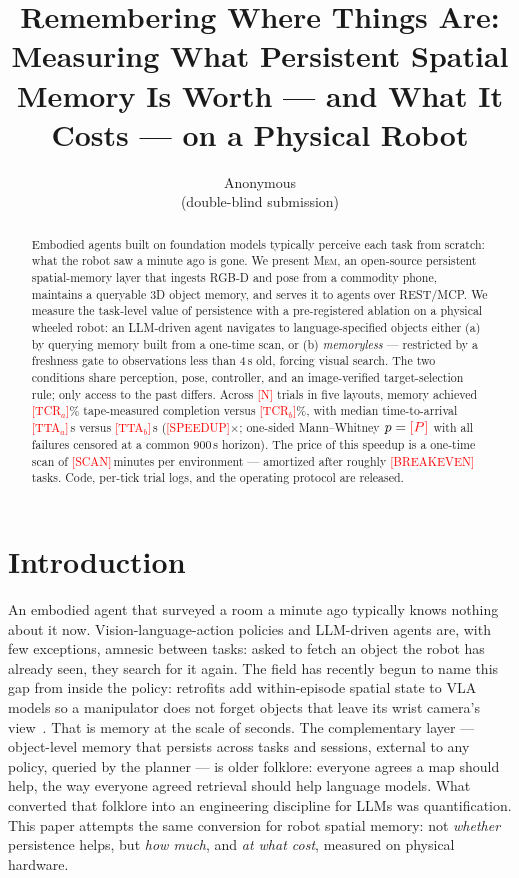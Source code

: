 \documentclass{article}
\title{Remembering Where Things Are: Measuring What Persistent Spatial
Memory Is Worth --- and What It Costs --- on a Physical Robot}
\author{Anonymous\\ (double-blind submission)}
\newcommand{\todo}[1]{\textcolor{red}{[#1]}}
\newcommand{\rtsm}{\textsc{Mem}} %
\begin{document}
\maketitle

\begin{abstract}
Embodied agents built on foundation models typically perceive each task
from scratch: what the robot saw a minute ago is gone. We present
\rtsm{}, an open-source persistent spatial-memory layer that ingests
RGB-D and pose from a commodity phone, maintains a queryable 3D object
memory, and serves it to agents over REST/MCP\@. We measure the
task-level value of persistence with a pre-registered ablation on a
physical wheeled robot: an LLM-driven agent navigates to
language-specified objects either (a) by querying memory built from a
one-time scan, or (b) \emph{memoryless} --- restricted by a freshness
gate to observations less than 4\,s old, forcing visual search. The two
conditions share perception, pose, controller, and an image-verified
target-selection rule; only access to the past differs. Across
\todo{N} trials in five layouts, memory achieved \todo{TCR$_a$}\%
tape-measured completion versus \todo{TCR$_b$}\%, with median
time-to-arrival \todo{TTA$_a$}\,s versus \todo{TTA$_b$}\,s
(\todo{SPEEDUP}$\times$; one-sided Mann--Whitney $p=\todo{P}$ with all
failures censored at a common 900\,s horizon). The price of this
speedup is a one-time scan of \todo{SCAN}\,minutes per environment ---
amortized after roughly \todo{BREAKEVEN} tasks. Code, per-tick trial
logs, and the operating protocol are released.
\end{abstract}

\section{Introduction}

An embodied agent that surveyed a room a minute ago typically knows
nothing about it now. Vision-language-action policies and LLM-driven
agents are, with few exceptions, amnesic between tasks: asked to fetch
an object the robot has already seen, they search for it again. The
field has recently begun to name this gap from inside the policy:
retrofits add within-episode spatial state to VLA models so a
manipulator does not forget objects that leave its wrist camera's
view~\cite{AtlasVLA2026}. That is memory at the scale of seconds. The
complementary layer --- object-level memory that persists across tasks
and sessions, external to any policy, queried by the planner --- is
older folklore: everyone agrees a map should help, the way everyone
agreed retrieval should help language models. What converted that
folklore into an engineering discipline for LLMs was quantification.
This paper attempts the same conversion for robot spatial memory: not
\emph{whether} persistence helps, but \emph{how much}, and \emph{at
what cost}, measured on physical hardware.
\end{document}
